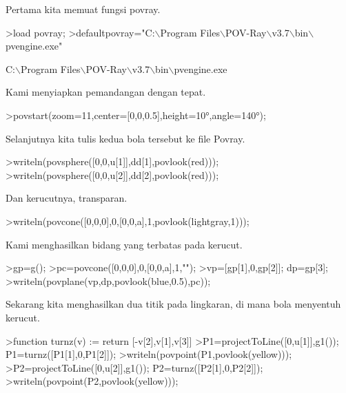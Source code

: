 \documentclass[12pt,Times new roman,letterpaper]{book}
\begin{document}
\begin{eulernootebook}
\begin{eulercomment}
\begin{eulercomment}
\begin{eulernootebook}
\begin{eulercomment}
\begin{eulercomment}
\begin{eulercomment}
\begin{eulercomment}
\begin{eulercomment}
\begin{eulercomment}
\begin{eulernotebook}
\begin{eulercomment}
\begin{eulercomment}
\begin{eulercomment}
\begin{eulercomment}
\begin{eulercomment}
\begin{eulercomment}
Pertama kita memuat fungsi povray.
\end{eulercomment}
\begin{eulerprompt}
>load povray;
>defaultpovray="C:\(\backslash\)Program Files\(\backslash\)POV-Ray\(\backslash\)v3.7\(\backslash\)bin\(\backslash\)pvengine.exe"
\end{eulerprompt}
\begin{euleroutput}
  C:\(\backslash\)Program Files\(\backslash\)POV-Ray\(\backslash\)v3.7\(\backslash\)bin\(\backslash\)pvengine.exe
\end{euleroutput}
\begin{eulercomment}
Kami menyiapkan pemandangan dengan tepat.
\end{eulercomment}
\begin{eulerprompt}
>povstart(zoom=11,center=[0,0,0.5],height=10°,angle=140°);
\end{eulerprompt}
\begin{eulercomment}
Selanjutnya kita tulis kedua bola tersebut ke file Povray.
\end{eulercomment}
\begin{eulerprompt}
>writeln(povsphere([0,0,u[1]],dd[1],povlook(red)));
>writeln(povsphere([0,0,u[2]],dd[2],povlook(red)));
\end{eulerprompt}
\begin{eulercomment}
Dan kerucutnya, transparan.
\end{eulercomment}
\begin{eulerprompt}
>writeln(povcone([0,0,0],0,[0,0,a],1,povlook(lightgray,1)));
\end{eulerprompt}
\begin{eulercomment}
Kami menghasilkan bidang yang terbatas pada kerucut.
\end{eulercomment}
\begin{eulerprompt}
>gp=g();
>pc=povcone([0,0,0],0,[0,0,a],1,"");
>vp=[gp[1],0,gp[2]]; dp=gp[3];
>writeln(povplane(vp,dp,povlook(blue,0.5),pc));
\end{eulerprompt}
\begin{eulercomment}
Sekarang kita menghasilkan dua titik pada lingkaran, di mana bola
menyentuh kerucut.
\end{eulercomment}
\begin{eulerprompt}
>function turnz(v) := return [-v[2],v[1],v[3]]
>P1=projectToLine([0,u[1]],g1()); P1=turnz([P1[1],0,P1[2]]);
>writeln(povpoint(P1,povlook(yellow)));
>P2=projectToLine([0,u[2]],g1()); P2=turnz([P2[1],0,P2[2]]);
>writeln(povpoint(P2,povlook(yellow)));
\end{eulerprompt}

\end{eulercomment}
\end{eulercomment}
\end{eulercomment}
\end{eulercomment}
\end{eulercomment}
\end{eulernotebook}
\end{eulercomment}
\end{eulercomment}
\end{eulercomment}
\end{eulercomment}
\end{eulercomment}
\end{eulercomment}
\end{eulernootebook}
\end{eulercomment}
\end{eulercomment}
\end{eulernootebook}
\end{document}
